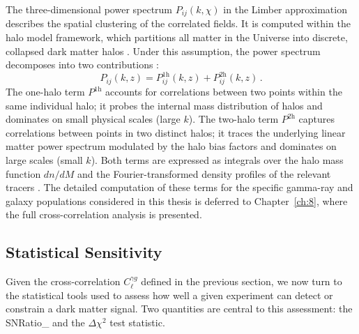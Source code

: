 The three-dimensional power spectrum $P_{ij}(k,\chi)$ in the Limber approximation describes the spatial clustering of the correlated fields.
It is computed within the halo model framework, which partitions all matter in the Universe into discrete, collapsed dark matter halos \cite{Cooray:2002dia}.
Under this assumption, the power spectrum decomposes into two contributions \cite{Cooray:2002dia,Fornengo:2013rga}:
\begin{equation}
	P_{ij}(k, z) = P_{ij}^{\mathrm{1h}}(k, z) + P_{ij}^{\mathrm{2h}}(k, z)\,.
	\label{eq:halo_model_decomposition}
\end{equation}
The one-halo term $P^{\mathrm{1h}}$ accounts for correlations between two points within the same individual halo; it probes the internal mass distribution of halos and dominates on small physical scales (large $k$).
The two-halo term $P^{\mathrm{2h}}$ captures correlations between points in two distinct halos; it traces the underlying linear matter power spectrum modulated by the halo bias factors and dominates on large scales (small $k$).
Both terms are expressed as integrals over the halo mass function $dn/dM$ and the Fourier-transformed density profiles of the relevant tracers \cite{Cooray:2002dia,Fornengo:2013rga}.
The detailed computation of these terms for the specific gamma-ray and galaxy populations considered in this thesis is deferred to Chapter~\ref{ch:8}, where the full cross-correlation analysis is presented.

\subsection{Statistical Sensitivity}
\label{sec:statistical_sensitivity}

Given the cross-correlation \APS $C_\ell^{\gamma g}$ defined in the previous section, we now turn to the statistical tools used to assess how well a given experiment can detect or constrain a dark matter signal.
Two quantities are central to this assessment: the \gls{SNRatio_} and the $\Delta\chi^2$ test statistic.

